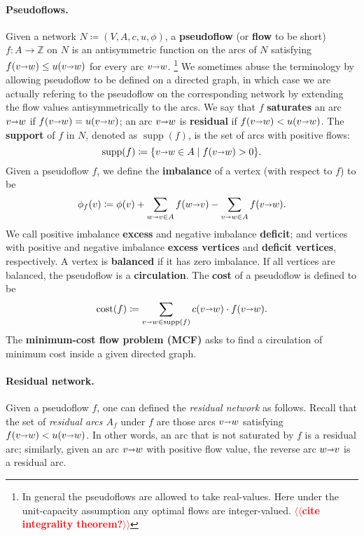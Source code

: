 \documentclass[11pt]{article}
\makeatletter
\def\ints{\mathbb{Z}}
\def\fsupply{\phi}
\def\arcto{\mathord\shortrightarrow}
\def\arc#1#2{#1\arcto#2}
\def\cost{\operatorname{cost}}
\def\supp{\operatorname{supp}}
\theoremstyle{plain}
\numberwithin{figure}{section}
\def\EMPH#1{\textbf{\boldmath #1}}
\def\n@te#1{\textsf{\boldmath \textbf{$\langle\!\langle$#1$\rangle\!\rangle$}}\leavevmode}
\def\note#1{\textcolor{red}{\n@te{#1}}}
\makeatother
\begin{document}
\paragraph{Pseudoflows.}
Given a network $N \coloneqq (V,A,c,u,\fsupply)$,
a \EMPH{pseudoflow} (or \EMPH{flow} to be short) $f\colon A \to \ints$ on $N$ is an antisymmetric function on the arcs of $N$
satisfying $f(\arc vw) \leq u(\arc vw)$ for every arc $\arc vw$.%
\footnote{In general the pseudoflows are allowed to take real-values.  Here under the unit-capacity assumption any optimal flows are integer-valued. \note{cite integrality theorem?}}
%
We sometimes abuse the terminology by allowing pseudoflow to be defined on a directed graph, in which case we are actually refering to the pseudoflow on the corresponding network by extending the flow values antisymmetrically to the arcs.
%
We say that $f$ \EMPH{saturates} an arc $\arc vw$ if $f(\arc vw) = u(\arc vw)$; an arc $\arc vw$ is \EMPH{residual} if $f(\arc vw) < u(\arc vw)$.
The \EMPH{support} of $f$ in $N$, denoted as \EMPH{$\supp(f)$}, is the set of arcs with positive flows:
\[
\supp(f) \coloneqq \{\arc vw \in A \mid f(\arc vw) > 0\}.
\]
%
Given a pseudoflow $f$, we define the \EMPH{imbalance} of a vertex (with respect to $f$) to be
\[
\EMPH{$\fsupply_f(v)$} \coloneqq \fsupply(v) + \sum_{\arc wv \in A}{f(\arc wv)} - \sum_{\arc vw \in A}{f(\arc vw)}.
\]
We call positive imbalance \EMPH{excess} and negative imbalance \EMPH{deficit};
and vertices with positive and negative imbalance \EMPH{excess vertices} and
\EMPH{deficit vertices}, respectively.
A vertex is \EMPH{balanced} if it has zero imbalance.
If all vertices are balanced, the pseudoflow is a \EMPH{circulation}.
The \EMPH{cost} of a pseudoflow
is defined to be
\[
 \EMPH{$\cost(f)$} \coloneqq \sum_{\arc vw \in \supp(f)} c(\arc vw) \cdot f(\arc vw).
\]
%
The \EMPH{minimum-cost flow problem (MCF)} asks to find a circulation of minimum cost inside a given directed graph.

\paragraph{Residual network.}
Given a pseudoflow $f$, one can defined the \emph{residual network} as follows.
%
Recall that the set of \emph{residual arcs $A_f$} under $f$ are those arcs $\arc vw$ satisfying $f(\arc vw) < u(\arc vw)$.  In other words, an arc that is not saturated by $f$ is a residual arc; similarly, given an arc $\arc vw$ with positive flow value, the reverse arc $\arc wv$ is a residual arc.
\end{document}
